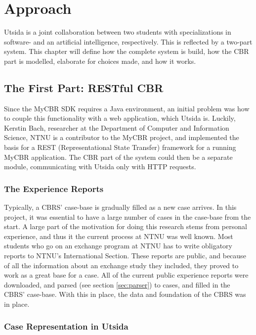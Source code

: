 
\chapter{Approach}

Utsida is a joint collaboration between two students with specializations in software- and an artificial intelligence, respectively. This is reflected by a two-part system. This chapter will define how the complete system is build, how the CBR part is modelled, elaborate for choices made, and how it works.

\section{The First Part: RESTful CBR}
Since the MyCBR SDK requires a Java environment, an initial problem was how to couple this functionality with a web application, which Utsida is. Luckily, Kerstin Bach, researcher at the Department of Computer and Information Science, NTNU is a contributor to the MyCBR project, and implemented the basis for a REST (Representational State Transfer) framework for a running MyCBR application. The CBR part of the system could then be a separate module, communicating with Utsida only with HTTP requests.



\subsection{The Experience Reports}\label{sec:experience_reports}
Typically, a CBRS' case-base is gradually filled as a new case arrives. In this project, it was essential to have a large number of cases in the case-base from the start. A large part of the motivation for doing this research stems from personal experience, and thus it the current process at NTNU was well known. Most students who go on an exchange program at NTNU has to write obligatory reports to NTNU's International Section. These reports are public, and because of all the information about an exchange study they included, they proved to work as a great base for a case. All of the current public experience reports were downloaded, and parsed (see section \ref{sec:parser}) to cases, and filled in the CBRS' case-base. With this in place, the data and foundation of the CBRS was in place.


\subsection{Case Representation in Utsida}


